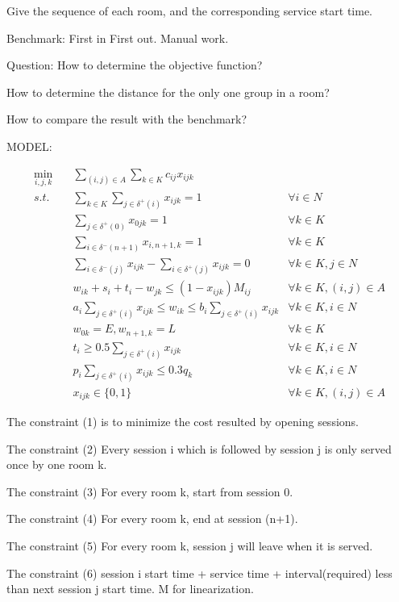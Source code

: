 Give the sequence of each room, and the corresponding service start time.

Benchmark: First in First out. Manual work.

Question: How to determine the objective function?

          How to determine the distance for the only one group in a room?

          How to compare the result with the benchmark?


MODEL:

\begin{align}
\min_{i,j,k} \quad & \sum_{(i,j) \in A} \sum_{k \in K} c_{ij} x_{ijk} \\
s.t. \quad  & \sum_{k \in K} \sum_{j \in \delta^+ (i)} x_{ijk} =1 & \forall i \in N  \\
& \sum_{j \in \delta^+ (0)} x_{0jk} =1 & \forall k \in K \\
& \sum_{i \in \delta^- (n+1)} x_{i,n+1,k} =1 & \forall k \in K \\
& \sum_{i \in \delta^- (j)} x_{ijk} - \sum_{i \in \delta^+ (j)} x_{ijk} = 0  & \forall k \in K, j \in N \\
& w_{ik} + s_i + t_{i} - w_{jk} \leq (1-x_{ijk}) M_{ij} & \forall k \in K, (i,j) \in A \\
& a_i \sum_{j \in \delta^+ (i)} x_{ijk} \leq w_{ik} \leq b_i \sum_{j \in \delta^+ (i)} x_{ijk} & \forall k \in K, i \in N \\
& w_{0k}=E, w_{n+1,k}=L  & \forall k \in K \\
& t_{i} \geq 0.5 \sum_{j \in \delta^+(i)} x_{ijk}  & \forall k \in K, i \in N  \\
& p_i \sum_{j \in \delta^+ (i)} x_{ijk} \leq 0.3 q_k & \forall k \in K, i \in N \\
& x_{ijk} \in \{0,1\} & \forall k \in K, (i,j) \in A
\end{align}

The constraint (1) is to minimize the cost resulted by opening sessions.

The constraint (2) Every session i which is followed by session j is only served once by one room k.

The constraint (3) For every room k, start from session 0.

The constraint (4) For every room k, end at session (n+1).

The constraint (5) For every room k, session j will leave when it is served.

The constraint (6) session i start time + service time + interval(required) less than next session j start time. M for linearization.

